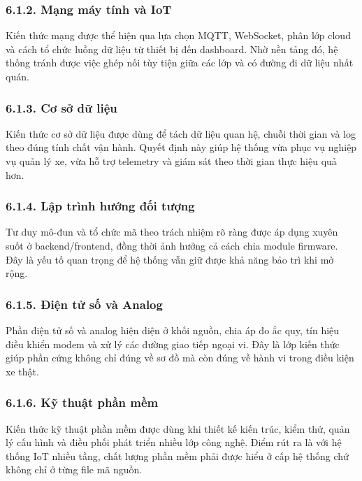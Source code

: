 \documentclass[a4paper]{extarticle}
\begin{document}
\subsubsection{6.1.2. Mạng máy tính và
IoT}\label{612-mux1ea1ng-muxe1y-tuxednh-vuxe0-iot}

Kiến thức mạng được thể hiện qua lựa chọn MQTT, WebSocket, phân lớp cloud và cách tổ chức luồng dữ liệu từ thiết bị đến dashboard. Nhờ nền tảng đó, hệ thống tránh được việc ghép nối tùy tiện giữa các lớp và có đường đi dữ liệu nhất quán.

\subsubsection{6.1.3. Cơ sở dữ
liệu}\label{613-cux1a1-sux1edf-dux1eef-liux1ec7u}

Kiến thức cơ sở dữ liệu được dùng để tách dữ liệu quan hệ, chuỗi thời gian và log theo đúng tính chất vận hành. Quyết định này giúp hệ thống vừa phục vụ nghiệp vụ quản lý xe, vừa hỗ trợ telemetry và giám sát theo thời gian thực hiệu quả hơn.

\subsubsection{6.1.4. Lập trình hướng đối
tượng}\label{614-lux1eadp-truxecnh-hux1b0ux1edbng-ux111ux1ed1i-tux1b0ux1ee3ng}

Tư duy mô-đun và tổ chức mã theo trách nhiệm rõ ràng được áp dụng xuyên suốt ở backend/frontend, đồng thời ảnh hưởng cả cách chia module firmware. Đây là yếu tố quan trọng để hệ thống vẫn giữ được khả năng bảo trì khi mở rộng.

\subsubsection{6.1.5. Điện tử số và
Analog}\label{615-ux111iux1ec7n-tux1eed-sux1ed1-vuxe0-analog}

Phần điện tử số và analog hiện diện ở khối nguồn, chia áp đo ắc quy, tín hiệu điều khiển modem và xử lý các đường giao tiếp ngoại vi. Đây là lớp kiến thức giúp phần cứng không chỉ đúng về sơ đồ mà còn đúng về hành vi trong điều kiện xe thật.

\subsubsection{6.1.6. Kỹ thuật phần
mềm}\label{616-kux1ef9-thuux1eadt-phux1ea7n-mux1ec1m}

Kiến thức kỹ thuật phần mềm được dùng khi thiết kế kiến trúc, kiểm thử, quản lý cấu hình và điều phối phát triển nhiều lớp công nghệ. Điểm rút ra là với hệ thống IoT nhiều tầng, chất lượng phần mềm phải được hiểu ở cấp hệ thống chứ không chỉ ở từng file mã nguồn.
\end{document}
